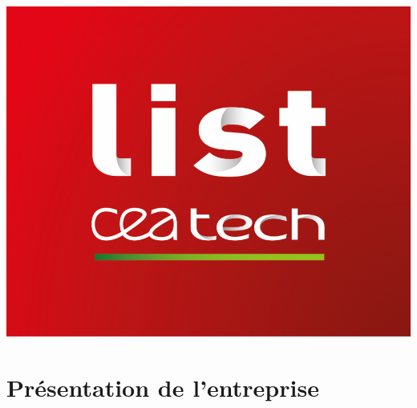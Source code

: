 \documentclass[11pt, headsepline, a4paper, fleqn, oneside]{article}
\begin{document}
\begin{titlepage}
\begin{minipage}{0.5\textwidth}
\centering
\includegraphics[scale=0.14]{logo-cea.png} 
\end{minipage}




\vfill %

\end{titlepage}

\tableofcontents
\newpage
\section{Présentation de l'entreprise}
\end{document}
